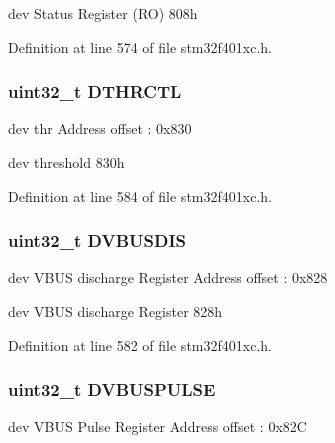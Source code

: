 dev Status Register (RO) 808h 

Definition at line 574 of file stm32f401xc.\+h.

\subsubsection[{\texorpdfstring{D\+T\+H\+R\+C\+TL}{DTHRCTL}}]{ uint32\+\_\+t D\+T\+H\+R\+C\+TL}\hypertarget{struct_u_s_b___o_t_g___device_type_def_ac5d3a4bffd921da5d69f9a601263b573}{}\label{struct_u_s_b___o_t_g___device_type_def_ac5d3a4bffd921da5d69f9a601263b573}
dev thr Address offset \+: 0x830

dev threshold 830h 

Definition at line 584 of file stm32f401xc.\+h.

\subsubsection[{\texorpdfstring{D\+V\+B\+U\+S\+D\+IS}{DVBUSDIS}}]{ uint32\+\_\+t D\+V\+B\+U\+S\+D\+IS}\hypertarget{struct_u_s_b___o_t_g___device_type_def_aef96b3719a70e62cb004b1e292b7a348}{}\label{struct_u_s_b___o_t_g___device_type_def_aef96b3719a70e62cb004b1e292b7a348}
dev V\+B\+US discharge Register Address offset \+: 0x828

dev V\+B\+US discharge Register 828h 

Definition at line 582 of file stm32f401xc.\+h.

\subsubsection[{\texorpdfstring{D\+V\+B\+U\+S\+P\+U\+L\+SE}{DVBUSPULSE}}]{ uint32\+\_\+t D\+V\+B\+U\+S\+P\+U\+L\+SE}\hypertarget{struct_u_s_b___o_t_g___device_type_def_acc968fd160f83749ad4176ad8cb36fe0}{}\label{struct_u_s_b___o_t_g___device_type_def_acc968fd160f83749ad4176ad8cb36fe0}
dev V\+B\+US Pulse Register Address offset \+: 0x82C

